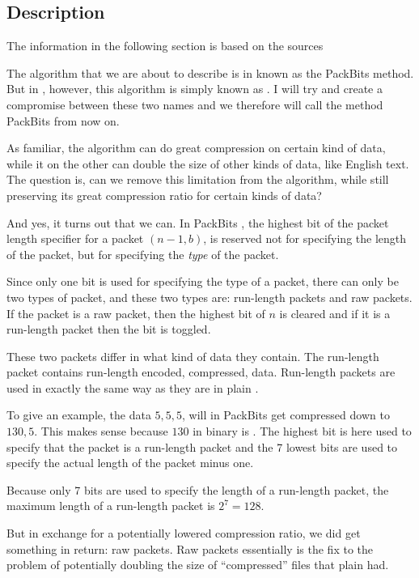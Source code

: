 \subsection{Description}

The information in the following section is based on the sources
\cite{96:_techn_note_tn102,apple1994inside,91:_truev_tga_file_format_specif}

The algorithm that we are about to describe is in
\cite{96:_techn_note_tn102,apple1994inside} known as the PackBits
method. But in \cite{91:_truev_tga_file_format_specif}, however, this
algorithm is simply known as \rle. I will try and create a compromise
between these two names and we therefore will call the method PackBits
\rle from now on.

As familiar, the \rle algorithm can do great compression on certain
kind of data, while it on the other can double the size of other kinds
of data, like English text. The question is, can we remove this
limitation from the algorithm, while still preserving its great
compression ratio for certain kinds of data?

And yes, it turns out that we can. In PackBits \rle, the highest bit of
the packet length specifier for a packet $(n-1,b)$, is reserved not
for specifying the length of the packet, but for specifying the
\textit{type} of the packet.

Since only one bit is used for specifying the type of a packet, there
can only be two types of packet, and these two types are: run-length
packets and raw packets. If the packet is a raw packet, then the
highest bit of $n$ is cleared and if it is a run-length packet then
the bit is toggled.

These two packets differ in what kind of data they contain. The
run-length packet contains run-length encoded, compressed,
data. Run-length packets are used in exactly the same way as they are
in plain \rle.

To give an example, the data $5,5,5$, will in PackBits \rle get
compressed down to $130,5$. This makes sense because $130$ in binary
is . The highest bit is here used to specify that the
packet is a run-length packet and the 7 lowest bits are used to
specify the actual length of the packet minus one.

Because only 7 bits are used to specify the length of a run-length
packet, the maximum length of a run-length packet is $2^7 = 128$.

But in exchange for a potentially lowered compression ratio, we did
get something in return: raw packets. Raw packets essentially is the
fix to the problem of potentially doubling the size of ``compressed''
files that plain \rle had.

